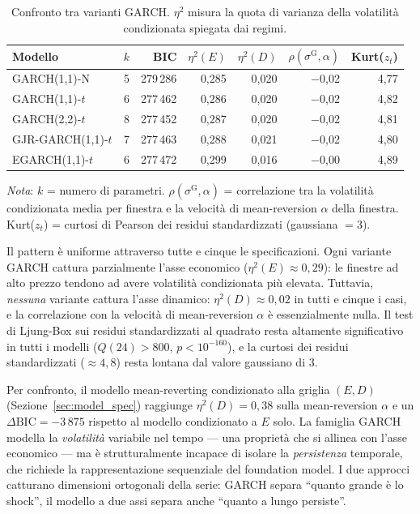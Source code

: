 \documentclass[12pt]{article}
\begin{document}
\begin{table}[H]
\centering
\caption{Confronto tra varianti GARCH. $\eta^2$ misura la quota di varianza della volatilità condizionata spiegata dai regimi.}
\label{tab:garch}
\small
\setlength{\tabcolsep}{4pt}
\begin{tabular}{lrrrrrr}
\toprule
Modello & $k$ & BIC & $\eta^2(E)$ & $\eta^2(D)$ & $\rho(\sigma^\text{G}\!,\alpha)$ & Kurt($z_t$) \\
\midrule
GARCH(1,1)-N        & 5 & 279\,286 & 0,285 & 0,020 & $-$0,02 & 4,77 \\
GARCH(1,1)-$t$      & 6 & 277\,462 & 0,286 & 0,020 & $-$0,02 & 4,82 \\
GARCH(2,2)-$t$      & 8 & 277\,452 & 0,287 & 0,020 & $-$0,02 & 4,81 \\
GJR-GARCH(1,1)-$t$  & 7 & 277\,463 & 0,288 & 0,021 & $-$0,02 & 4,80 \\
EGARCH(1,1)-$t$     & 6 & 277\,472 & 0,299 & 0,016 & $-$0,00 & 4,89 \\
\bottomrule
\end{tabular}
\par\smallskip
\footnotesize\textit{Nota}: $k$ = numero di parametri. $\rho(\sigma^\text{G}\!,\alpha)$ = correlazione tra la volatilità condizionata media per finestra e la velocità di mean-reversion $\alpha$ della finestra. Kurt($z_t$) = curtosi di Pearson dei residui standardizzati (gaussiana $= 3$).
\end{table}

Il pattern è uniforme attraverso tutte e cinque le specificazioni.
Ogni variante GARCH cattura parzialmente l'asse economico ($\eta^2(E) \approx 0{,}29$): le finestre ad alto prezzo tendono ad avere volatilità condizionata più elevata.
Tuttavia, \emph{nessuna} variante cattura l'asse dinamico: $\eta^2(D) \approx 0{,}02$ in tutti e cinque i casi, e la correlazione con la velocità di mean-reversion $\alpha$ è essenzialmente nulla.
Il test di Ljung-Box sui residui standardizzati al quadrato resta altamente significativo in tutti i modelli ($Q(24) > 800$, $p < 10^{-160}$), e la curtosi dei residui standardizzati ($\approx 4{,}8$) resta lontana dal valore gaussiano di 3.

Per confronto, il modello mean-reverting condizionato alla griglia $(E, D)$ (Sezione~\ref{sec:model_spec}) raggiunge $\eta^2(D) = 0{,}38$ sulla mean-reversion $\alpha$ e un $\Delta\text{BIC} = -3\,875$ rispetto al modello condizionato a $E$ solo.
La famiglia GARCH modella la \emph{volatilità} variabile nel tempo --- una proprietà che si allinea con l'asse economico --- ma è strutturalmente incapace di isolare la \emph{persistenza} temporale, che richiede la rappresentazione sequenziale del foundation model.
I due approcci catturano dimensioni ortogonali della serie: GARCH separa ``quanto grande è lo shock'', il modello a due assi separa anche ``quanto a lungo persiste''.
\end{document}
